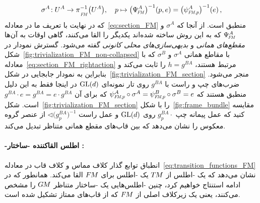 \begin{align}\label{eq:identity_section_def}
	\sigma^A\!:U^A\to\piFM^{-1}\big(U^A\big),\ \ \ p \mapsto \big(\PsiFM^A\big)^{-1}(p,e) = \big(\psiFMp^A\big)^{-1}(e) \,,
\end{align}
که در نهایت با تعریف ما در معادله~\eqref{eq:section_FM} منطبق است.
از آنجا که $\sigma^A$ و $\PsiFM^A$ که به این روش ساخته شده‌اند یکدیگر را القا می‌کنند، گاهی اوقات به آن‌ها \emph{مقطع‌های همانی} و \emph{بدیهی‌سازی‌های محلی کانونی} گفته می‌شود.
گسترش نمودار در شکل~\ref{fig:trivialization_FM_non-collapsed} با مقاطع همانی $\sigma^A$ و $\sigma^B$ که با معادله~\ref{eq:section_FM_rightaction} مرتبط هستند، $h=g^{BA}$ را ثابت می‌کند و بنابراین به نمودار جابجایی در شکل~\ref{fig:trivialization_FM_section} منجر می‌شود.
ضرب‌های چپ و راست با $g^{BA}$ روی تار نمونه‌ای $\operatorname{GL}(d)$ در اینجا فقط به این دلیل منطبق هستند که $\psiFMp^A\circ\sigma^A = \psiFMp^B\circ\sigma^B = e$ که برای آن $g^{BA}\cdot e = g^{BA} = e\cdot g^{BA}$ است.
شکل~\ref{fig:trivialization_FM_section} را با شکل~\ref{fig:frame_bundle} مقایسه کنید که عمل پیمانه چپ $g_p^{BA}\cdot$ روی $\operatorname{GL}(d)$ و عمل راست $\lhd\big( g_p^{BA} \big)^{-1}$ از عنصر گروه معکوس را نشان می‌دهد که بین قاب‌های مقطع همانی متناظر تبدیل می‌کند.











\paragraph{-اطلس القاکننده -ساختار :}

انطباق توابع گذار کلاف مماس و کلاف قاب در معادله~\eqref{eq:transition_functions_FM} نشان می‌دهد که یک -اطلس از $T\mkern-1.5muM$ یک -اطلس برای $F\mkern-1.5muM$ القا می‌کند.
همانطور که در ادامه استنتاج خواهیم کرد، چنین -اطلس‌هایی یک -ساختار متناظر $G\mkern-1.4muM$ را مشخص می‌کنند، یعنی یک زیرکلاف اصلی  از $F\mkern-1.5muM$ که از قاب‌های ممتاز تشکیل شده است.

